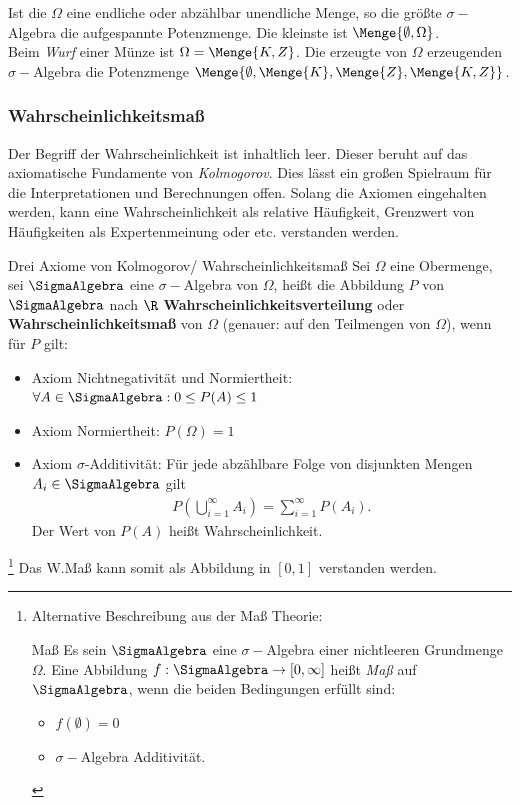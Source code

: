 Ist die $\Omega$ eine endliche oder abzählbar unendliche Menge, so die größte $\sigma-$Algebra die aufgespannte Potenzmenge. Die kleinste ist $\Menge{\emptyset, \Omega}$.\\

Beim \textit{Wurf} einer Münze ist $\Omega = \Menge{K,Z}$. Die erzeugte von $\Omega$ erzeugenden $\sigma-$Algebra die Potenzmenge $\Menge{\emptyset, \Menge{K}, \Menge{Z}, \Menge{K,Z}}$. 

\subsubsection{Wahrscheinlichkeitsmaß}
Der Begriff der Wahrscheinlichkeit ist inhaltlich leer. Dieser beruht auf das axiomatische Fundamente von \textit{Kolmogorov}. Dies lässt ein großen Spielraum für die Interpretationen und Berechnungen offen. Solang die Axiomen eingehalten werden, kann eine Wahrscheinlichkeit als relative Häufigkeit, Grenzwert von Häufigkeiten als Expertenmeinung oder etc. verstanden werden.

\begin{Definition}{Drei Axiome von Kolmogorov/ Wahrscheinlichkeitsmaß}
	Sei $\Omega$ eine Obermenge, sei $\SigmaAlgebra$ eine $\sigma-$Algebra von $\Omega$, heißt die Abbildung $P$ von $\SigmaAlgebra$ nach $\R$ \textbf{Wahrscheinlichkeitsverteilung} oder \textbf{Wahrscheinlichkeitsmaß} von $\Omega$ (genauer: auf den Teilmengen von $\Omega$), wenn für $P$ gilt:
	\begin{itemize}
		\item Axiom Nichtnegativität und Normiertheit: $\forall A\in \SigmaAlgebra: 0\leq P(A) \leq 1$
		\item Axiom Normiertheit: $P(\Omega) = 1$
		\item Axiom $\sigma$-Additivität: Für jede abzählbare Folge von disjunkten Mengen $A_i\in \SigmaAlgebra$ gilt
		\begin{align*}
			P\left( \bigcup_{i=1}^{\infty}A_i \right) = \sum_{i=1}^{\infty} P(A_i).
		\end{align*}
	Der Wert von $P(A)$ heißt Wahrscheinlichkeit.
	\end{itemize}
\end{Definition} \footnote{Alternative Beschreibung aus der Maß Theorie: \begin{Lemma-Definition}{Maß}
	Es sein $\SigmaAlgebra$ eine $\sigma-$Algebra einer nichtleeren Grundmenge $\Omega$. Eine Abbildung $f:\SigmaAlgebra\rightarrow [0,\infty]$ heißt \textit{Maß} auf $\SigmaAlgebra$, wenn die beiden Bedingungen erfüllt sind:
	\begin{itemize}
		\item $f(\emptyset)=0$
		\item $\sigma-$Algebra Additivität.
	\end{itemize}
\end{Lemma-Definition}}
Das \gls{W.}Maß kann somit als Abbildung in $[0,1]$ verstanden werden.\\

